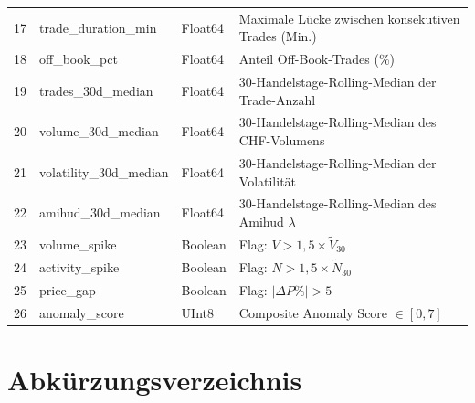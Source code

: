 \documentclass[11pt, a4paper, oneside, openany]{report}
\begin{document}
\begin{longtable}{c >{\ttfamily}l l p{6cm}}
\rowcolor{LightSilver}
17 & trade\_duration\_min    & Float64  & Maximale Lücke zwischen konsekutiven Trades (Min.) \\
18 & off\_book\_pct          & Float64  & Anteil Off-Book-Trades (\%) \\
\rowcolor{LightSilver}
19 & trades\_30d\_median     & Float64  & 30-Handelstage-Rolling-Median der Trade-Anzahl \\
20 & volume\_30d\_median     & Float64  & 30-Handelstage-Rolling-Median des CHF-Volumens \\
\rowcolor{LightSilver}
21 & volatility\_30d\_median & Float64  & 30-Handelstage-Rolling-Median der Volatilität \\
22 & amihud\_30d\_median     & Float64  & 30-Handelstage-Rolling-Median des Amihud $\lambda$ \\
\rowcolor{LightSilver}
23 & volume\_spike          & Boolean  & Flag: $V > 1{,}5 \times \tilde{V}_{30}$ \\
24 & activity\_spike        & Boolean  & Flag: $N > 1{,}5 \times \tilde{N}_{30}$ \\
\rowcolor{LightSilver}
25 & price\_gap             & Boolean  & Flag: $|\Delta P\%| > 5$ \\
26 & anomaly\_score         & UInt8    & Composite Anomaly Score $\in [0, 7]$ \\
\end{longtable}


\chapter{Abkürzungsverzeichnis}
\label{app:abkuerzungen}

\printglossary[type=\acronymtype, title={}, nonumberlist]


\vfill
\end{document}
